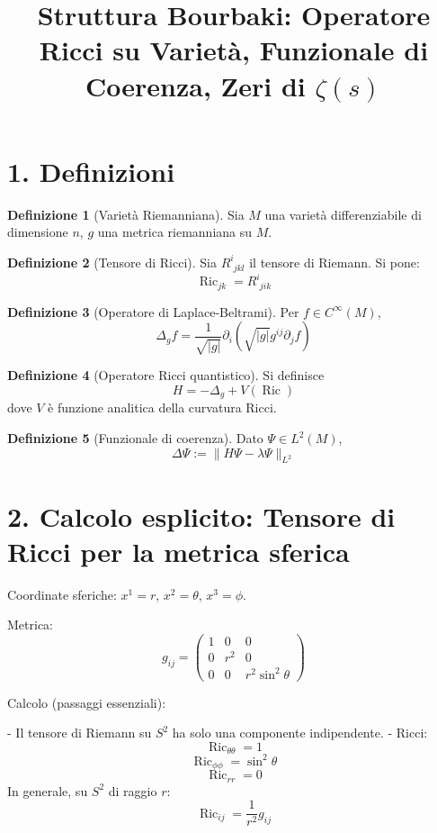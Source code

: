 \documentclass[12pt]{article}
\title{Struttura Bourbaki: Operatore Ricci su Varietà, Funzionale di Coerenza, Zeri di $\zeta(s)$}
\author{}
\date{}
\theoremstyle{definition}
\newtheorem{defn}{Definizione}
\begin{document}
\section*{1. Definizioni}

\begin{defn}[Varietà Riemanniana]
Sia $M$ una varietà differenziabile di dimensione $n$, $g$ una metrica riemanniana su $M$.
\end{defn}

\begin{defn}[Tensore di Ricci]
Sia $R^i_{\phantom{i}jkl}$ il tensore di Riemann. Si pone:
\[
\operatorname{Ric}_{jk} = R^i_{\phantom{i}jik}
\]
\end{defn}

\begin{defn}[Operatore di Laplace-Beltrami]
Per $f \in C^\infty(M)$,
\[
\Delta_g f = \frac{1}{\sqrt{|g|}}\partial_i\left(\sqrt{|g|}g^{ij}\partial_j f\right)
\]
\end{defn}

\begin{defn}[Operatore Ricci quantistico]
Si definisce
\[
H = -\Delta_g + V(\operatorname{Ric})
\]
dove $V$ è funzione analitica della curvatura Ricci.
\end{defn}

\begin{defn}[Funzionale di coerenza]
Dato $\Psi \in L^2(M)$,
\[
\Delta\Psi := \|H\Psi - \lambda\Psi\|_{L^2}
\]
\end{defn}

\section*{2. Calcolo esplicito: Tensore di Ricci per la metrica sferica}

Coordinate sferiche: $x^1 = r$, $x^2 = \theta$, $x^3 = \phi$.

Metrica:
\[
g_{ij} = \begin{pmatrix}
1 & 0 & 0 \\
0 & r^2 & 0 \\
0 & 0 & r^2\sin^2\theta
\end{pmatrix}
\]

Calcolo (passaggi essenziali):

- Il tensore di Riemann su $S^2$ ha solo una componente indipendente.
- Ricci:
\[
\operatorname{Ric}_{\theta\theta} = 1
\]
\[
\operatorname{Ric}_{\phi\phi} = \sin^2\theta
\]
\[
\operatorname{Ric}_{rr} = 0
\]
In generale, su $S^2$ di raggio $r$:
\[
\operatorname{Ric}_{ij} = \frac{1}{r^2}g_{ij}
\]
\end{document}
